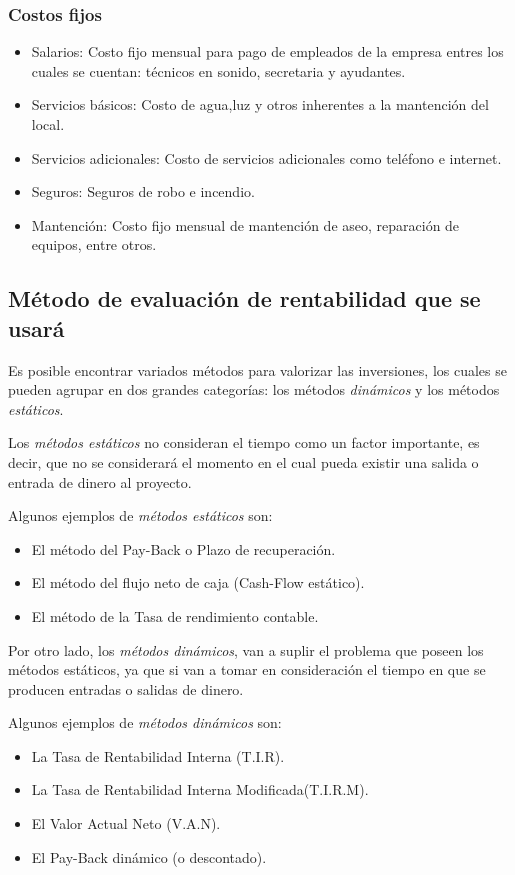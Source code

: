 \subsubsection{Costos fijos}
\begin{itemize}
	\item Salarios:
			Costo fijo mensual para pago de empleados de la empresa entres los cuales se cuentan:
			técnicos en sonido, secretaria y ayudantes.
	\item Servicios básicos:
			Costo de agua,luz y otros inherentes a la mantención del local.
	\item Servicios adicionales:
			Costo de servicios adicionales como teléfono e internet.
	\item Seguros:
			Seguros de robo e incendio.
	\item Mantención:
			Costo fijo mensual de mantención de aseo, reparación de equipos, entre otros.
\end{itemize}


\subsection{Método de evaluación de rentabilidad que se usará}

Es posible encontrar variados
métodos para valorizar las inversiones, 
los cuales se pueden agrupar en dos grandes categorías: los métodos \emph{dinámicos} y los métodos \emph{estáticos}.

Los \emph{métodos estáticos} no consideran
el tiempo como un factor importante,
es decir, que no se considerará el momento en el cual
pueda existir una salida o entrada de dinero al
proyecto.

Algunos ejemplos de \emph{métodos estáticos} son:
\begin{itemize}
	\item El método del Pay-Back o Plazo de recuperación.
	\item El método del flujo neto de caja (Cash-Flow estático).
	\item El método de la Tasa de rendimiento contable.
\end{itemize}

Por otro lado,
los \emph{métodos dinámicos}, van a suplir el problema
que poseen los métodos estáticos, ya que si van a tomar
en consideración el tiempo en que se producen entradas
o salidas de dinero.

Algunos ejemplos de \emph{métodos dinámicos} son:
\begin{itemize}
	\item La Tasa de Rentabilidad Interna (T.I.R).
	\item La Tasa de Rentabilidad Interna Modificada(T.I.R.M).
	\item El Valor Actual Neto (V.A.N).
	\item El Pay-Back dinámico (o descontado).
\end{itemize}

